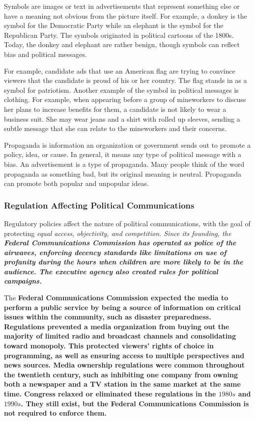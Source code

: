 \begin{definition}[Symbols]
    Symbols are images or text in advertisements that represent something else or have a meaning not obvious from the picture itself. For example, a donkey is the symbol for the Democratic Party while an elephant is the symbol for the Republican Party. The symbols originated in political cartoons of the 1800s. Today, the donkey and elephant are rather benign, though symbols can reflect bias and political messages.
    
    For example, candidate ads that use an American flag are trying to convince viewers that the candidate is proud of his or her country. The flag stands in as a symbol for patriotism. Another example of the symbol in political messages is clothing. For example, when appearing before a group of mineworkers to discuss her plans to increase benefits for them, a candidate is not likely to wear a business suit. She may wear jeans and a shirt with rolled up sleeves, sending a subtle message that she can relate to the mineworkers and their concerns.
\end{definition}

\begin{definition}[Propaganda]
    Propaganda is information an organization or government sends out to promote a policy, idea, or cause. In general, it means any type of political message with a bias. An advertisement is a type of propaganda. Many people think of the word propaganda as something bad, but its original meaning is neutral. Propaganda can promote both popular and unpopular ideas.
\end{definition}

\subsubsection*{Regulation Affecting Political Communications}

Regulatory policies affect the nature of political communications, with the goal of protecting \it{equal access, objectivity, and competition}. Since its founding, the \bf{Federal Communications Commission} has operated as police of the airwaves, enforcing decency standards like limitations on use of profanity during the hours when children are more likely to be in the audience. The executive agency also created rules for political campaigns.

The \bf{Federal Communications Commission} expected the media to perform a public service by being a source of information on critical issues within the community, such as disaster preparedness. Regulations prevented a media organization from buying out the majority of limited radio and broadcast channels and consolidating toward monopoly. This protected viewers' rights of choice in programming, as well as ensuring access to multiple perspectives and news sources. Media ownership regulations were common throughout the twentieth century, such as inhibiting one company from owning both a newspaper and a TV station in the same market at the same time. \bf{Congress} relaxed or eliminated these regulations in the $1980s$ and $1990s$. They still exist, but the \bf{Federal Communications Commission} is not required to enforce them.

